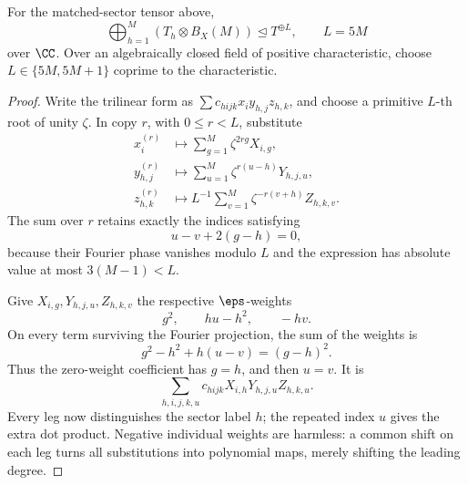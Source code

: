 \begin{proposition}
\label{prop:mm-nine-fourths-separate}
For the matched-sector tensor above,
\[
 \bigoplus_{h=1}^M(T_h\otimes B_X(M))
       \trianglelefteq T^{\oplus L},\qquad L=5M
\]
over \(\CC\). Over an algebraically closed field of positive characteristic, choose \(L\in\{5M,5M+1\}\) coprime to the characteristic.
\end{proposition}
\begin{proof}
Write the trilinear form as \(\sum c_{hijk}x_i y_{h,j}z_{h,k}\), and choose a primitive \(L\)-th root of unity \(\zeta\). In copy \(r\), with \(0\leq r<L\), substitute
\begin{align*}
 x_i^{(r)}&\mapsto\sum_{g=1}^M\zeta^{2rg}X_{i,g},\\
 y_{h,j}^{(r)}&\mapsto\sum_{u=1}^M\zeta^{r(u-h)}Y_{h,j,u},\\
 z_{h,k}^{(r)}&\mapsto L^{-1}\sum_{v=1}^M\zeta^{-r(v+h)}Z_{h,k,v}.
\end{align*}
The sum over \(r\) retains exactly the indices satisfying
\[
 u-v+2(g-h)=0,
\]
because their Fourier phase vanishes modulo \(L\) and the expression has absolute value at most \(3(M-1)<L\).

Give \(X_{i,g},Y_{h,j,u},Z_{h,k,v}\) the respective \(\eps\)-weights
\[
 g^2,\qquad hu-h^2,\qquad -hv.
\]
On every term surviving the Fourier projection, the sum of the weights is
\[
 g^2-h^2+h(u-v)=(g-h)^2.
\]
Thus the zero-weight coefficient has \(g=h\), and then \(u=v\). It is
\[
 \sum_{h,i,j,k,u}c_{hijk}X_{i,h}Y_{h,j,u}Z_{h,k,u}.
\]
Every leg now distinguishes the sector label \(h\); the repeated index \(u\) gives the extra dot product. Negative individual weights are harmless: a common shift on each leg turns all substitutions into polynomial maps, merely shifting the leading degree.
\end{proof}

